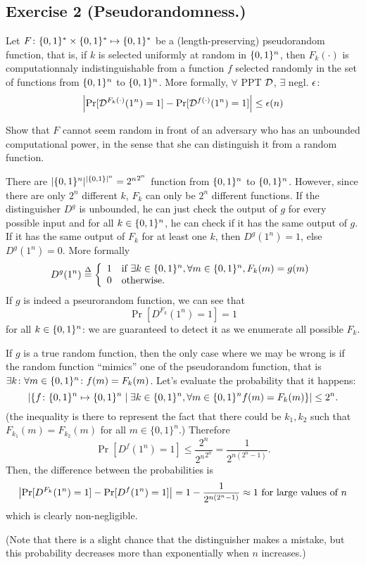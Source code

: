 \subsection{Exercise 2 (Pseudorandomness.)}

Let $F\colon \{0, 1\}^* \times \{0, 1\}^* \mapsto \{0, 1\}^*$ be a
(length-preserving) pseudorandom function, that is, if $k$ is selected
uniformly at random in $\{0, 1\}^n$, then $F_k(\cdot)$ is
computationnaly indistinguishable from a function $f$ selected randomly in the set of
functions from $\{0, 1\}^n$ to $\{0, 1\}^n$. More formally, $\forall$ PPT $\mathcal{D}$, $\exists$ negl. $\epsilon$:
\[\left|\Pr[\mathcal{D}^{F_k(\cdot)}(1^n)=1]-\Pr[\mathcal{D}^{f(\cdot)}(1^n)=1]\right|\leq\epsilon(n)\]

Show that $F$ cannot seem random in front of an adversary who has an unbounded computational power,
in the sense that she can distinguish it from a random function.


\begin{solution}
  There are $|\{0, 1\}^n|^{|\{0, 1\}|^n} = {2^n}^{2^n}$ function from $\{0, 1\}^n$ to $\{0, 1\}^n$.
  However, since there are only $2^n$ different $k$, $F_k$ can only be $2^n$ different functions.
  If the distinguisher $D^g$ is unbounded, he can just check the output of $g$ for every possible input and for all $k \in \{0, 1\}^n$, he can check if it has the same output of $g$.
  If it has the same output of $F_k$ for at least one $k$, then $D^g(1^n) = 1$, else $D^g(1^n) = 0$.
  More formally
  \[
    D^g(1^n) \overset{\Delta}{=}
    \left\{ \begin{array}{rl}
        1 & \mbox{if }\exists k \in \{0,1\}^n, \forall m \in \{0, 1\}^n, F_k(m) = g(m)\\
		0 & \mbox{otherwise.}\\
    \end{array} \right.
  \]
  If $g$ is indeed a pseurorandom function, we can see that
  \[ \Pr[D^{F_k}(1^n) = 1] = 1 \]
  for all $k \in \{0, 1\}^n$: we are guaranteed to detect it as we enumerate all possible $F_k$.

  If $g$ is a true random function, then the only case where we may be wrong is if the random function ``mimics'' one of the pseudorandom function, that is $\exists k\colon \forall m \in \{0, 1\}^n \colon f(m)=F_k(m)$. Let's evaluate the probability that it happens:
  \[ |\{f \colon \{0,1\}^n \mapsto \{0,1\}^n \suchthat \exists k \in \bset^n, \forall m \in \bset^n f(m) = F_k(m) \}| \leq 2^n. \]
  (the inequality is there to represent the fact that there could be $k_1,k_2$ such that $F_{k_1}(m) = F_{k_2}(m)$ for all $m \in \{0,1\}^n$.)
  Therefore
  \[ \Pr[D^{f}(1^n) = 1] \leq \frac{2^n}{{2^n}^{2^n}} = \frac{1}{2^{n(2^n-1)}}. \]
  Then, the difference between the probabilities is
  \[ {\left\lvert\Pr[D^{F_k}(1^n)=1] - \Pr[D^f(1^n)=1]\right\lvert} = 1-\frac{1}{2^{n(2^n-1)}} \approx 1 \text{ for large values of } n \]
  which is clearly non-negligible.

  (Note that there is a slight chance that the distinguisher makes a mistake, but this probability decreases more than exponentially when $n$ increases.)
\end{solution}



